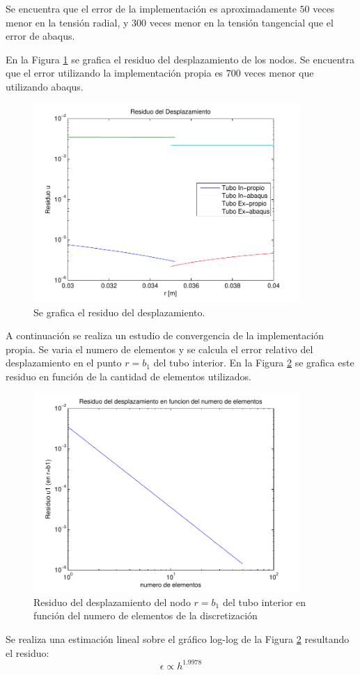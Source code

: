 Se encuentra que el error de la implementaci\'on es aproximadamente $50$ veces menor en la tensi\'on radial, y $300$ veces menor en la tensi\'on tangencial que el error de abaqus.

En la Figura \ref{fig:resU} se grafica el residuo del desplazamiento de los nodos. Se encuentra que el error utilizando la implementaci\'on propia es $700$ veces menor  que utilizando abaqus.

\begin{figure}[!ht]
\centering
\includegraphics[width=0.9\textwidth]{figure3.pdf}
\caption{Se grafica el residuo del desplazamiento.}
\label{fig:resU}
\end{figure}

A continuaci\'on se realiza un estudio de convergencia de la implementaci\'on propia. Se varia el numero de elementos y se calcula el error relativo del desplazamiento en el punto $r=b_1$ del tubo interior. En la Figura \ref{fig:eN} se grafica este residuo en funci\'on de la cantidad de elementos utilizados.

\begin{figure}[!ht]
\centering
\includegraphics[width=0.9\textwidth]{figure4.pdf}
\caption{Residuo del desplazamiento del nodo $r=b_1$ del tubo interior en funci\'on del numero de elementos de la discretizaci\'on}
\label{fig:eN}
\end{figure}

Se realiza una estimaci\'on lineal sobre el gr\'afico log-log de la Figura \ref{fig:eN} resultando el residuo:
\begin{equation}
\epsilon\propto h^{1.9978}
\end{equation}